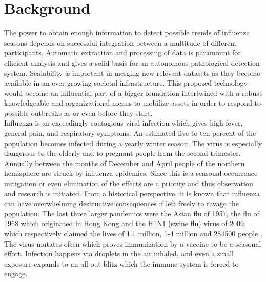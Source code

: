 \section{Background}
The power to obtain enough information to detect possible trends of influenza seasons depends on successful integration between a multitude of different participants. Automatic extraction and processing of data is paramount for efficient analysis and gives a solid basis for an autonomous pathological detection system. Scalability is important in merging new relevant datasets as they become available in an ever-growing societal infrastructure. This proposed technology would become an influential part of a bigger foundation intertwined with a robust knowledgeable and organizational means to mobilize assets in order to respond to possible outbreaks as or even before they start.
\newline \\
Influenza is an exceedingly contagious viral infection which gives high fever, general pain, and respiratory symptoms\cite{fhi_sykdommer}. An estimated five to ten percent of the population becomes infected during a yearly winter season. The virus is especially dangerous to the elderly and to pregnant people from the second-trimester. Annually between the months of December and April people of the northern hemisphere are struck by influenza epidemics. Since this is a seasonal occurrence mitigation or even elimination of the effects are a priority and thus observation and research is initiated. From a historical perspective, it is known that influenza can have overwhelming destructive consequences if left freely to ravage the population. The last three larger pandemics were the Asian flu of 1957, the flu of 1968 which originated in Hong Kong and the H1N1 (swine flu) virus of 2009, which respectively claimed the lives of 1.1 million, 1-4 million and 284500 people \cite{potter2001history}. The virus mutates often which proves immunization by a vaccine to be a seasonal effort. Infection happens via droplets in the air inhaled, and even a small exposure expands to an all-out blitz which the immune system is forced to engage.

